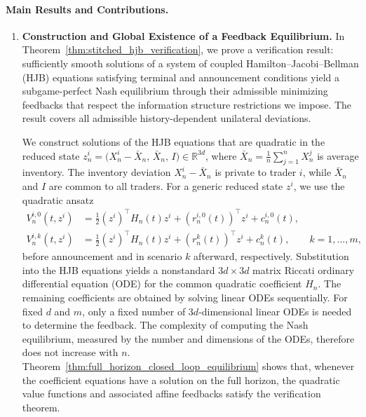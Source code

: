 \documentclass[12pt]{article}
\numberwithin{equation}{section}
\theoremstyle{definition}
\begin{document}
\paragraph{Main Results and Contributions.}
\begin{enumerate}
\item \textbf{Construction and Global Existence of a Feedback Equilibrium.}
In Theorem~\ref{thm:stitched_hjb_verification}, we prove a verification
result: sufficiently smooth solutions of a system of
coupled Hamilton--Jacobi--Bellman (HJB) equations satisfying
terminal and announcement conditions yield a subgame-perfect Nash
equilibrium through their admissible minimizing feedbacks that respect the information 
structure restrictions we impose.
The result covers all admissible history-dependent unilateral deviations.

We construct solutions of the HJB equations that are quadratic in the
reduced state
\(
z_n^i=\bigl(X_n^i-\bar X_n,\,\bar X_n,\,I\bigr)\in\mathbb R^{3d}
\),
where \(\bar X_n=\frac1n\sum_{j=1}^n X_n^j\) is average inventory.
The inventory deviation \(X_n^i-\bar X_n\) is private to trader \(i\),
while \(\bar X_n\) and \(I\) are common to all traders.
For a generic reduced state \(z^i\), we use the quadratic ansatz
\begin{equation}\label{eq:intro_quadratic_value_ansatz}
\begin{aligned}
V_n^{i,0}(t,z^i)
&=
\frac{1}{2}(z^i)^\top H_n(t)z^i
+(r_n^{i,0}(t))^\top z^i+c_n^{i,0}(t),\\
V_n^{i,k}(t,z^i)
&=
\frac{1}{2}(z^i)^\top H_n(t)z^i
+(r_n^k(t))^\top z^i+c_n^k(t),
\qquad k=1,\ldots,m,
\end{aligned}
\end{equation}
before announcement and in scenario \(k\) afterward, respectively.
Substitution into the HJB equations yields a nonstandard
\(3d\times3d\) matrix Riccati ordinary differential equation (ODE) for
the common quadratic coefficient \(H_n\). The remaining coefficients are
obtained by solving linear ODEs sequentially. For fixed \(d\) and \(m\),
only a fixed number of \(3d\)-dimensional linear ODEs is needed to determine
the feedback. The complexity of computing the Nash equilibrium, measured
by the number and dimensions of the ODEs, therefore does not increase with
\(n\). Theorem~\ref{thm:full_horizon_closed_loop_equilibrium} shows that,
whenever the coefficient equations have a solution on the full horizon,
the quadratic value functions and associated affine feedbacks satisfy
the verification theorem.


\end{enumerate}
\end{document}
